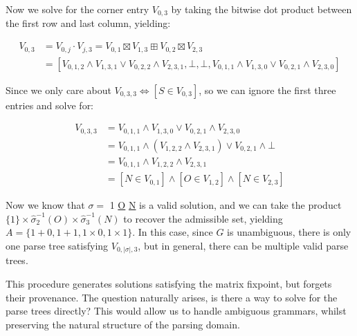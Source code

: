 \documentclass[sigplan,review,anonymous,acmsmall]{acmart}\settopmatter{printfolios=false,printccs=false,printacmref=false}
\begin{document}
  Now we solve for the corner entry $V_{0, 3}$ by taking the bitwise dot product between the first row and last column, yielding:

  \begin{align*}
    V_{0, 3} &= V_{0, j} \cdot V_{j, 3} = V_{0, 1} \boxtimes V_{1, 3} \boxplus V_{0, 2} \boxtimes V_{2, 3}\\
    &= [V_{0, 1, 2} \land V_{1, 3, 1} \lor V_{0, 2, 2} \land V_{2, 3, 1}, \bot, \bot, V_{0, 1, 1} \land V_{1, 3, 0} \lor V_{0, 2, 1} \land V_{2, 3, 0}]
  \end{align*}

  \noindent Since we only care about $V_{0, 3, 3} \Leftrightarrow [S \in V_{0, 3}]$, so we can ignore the first three entries and solve for:

  \begin{align*}
    V_{0, 3, 3} &= V_{0, 1, 1} \land V_{1, 3, 0} \lor V_{0, 2, 1} \land V_{2, 3, 0}\\
    &= V_{0, 1, 1} \land (V_{1, 2, 2} \land V_{2, 3, 1}) \lor V_{0, 2, 1} \land \bot\\
    &= V_{0, 1, 1} \land V_{1, 2, 2} \land V_{2, 3, 1}\\
    &= [N \in V_{0, 1}] \land [O \in V_{1, 2}] \land [N \in V_{2, 3}]
  \end{align*}

  Now we know that $\sigma =$ 1 \underline{O} \underline{N} is a valid solution, and we can take the product $\{1\}\times \hat\sigma_2^{-1}(O) \times \hat\sigma_3^{-1}(N)$ to recover the admissible set, yielding $A=\{1+0, 1+1, 1\times 0, 1\times 1\}$. In this case, since $G$ is unambiguous, there is only one parse tree satisfying $V_{0, |\sigma|, 3}$, but in general, there can be multiple valid parse trees.

  This procedure generates solutions satisfying the matrix fixpoint, but forgets their provenance. The question naturally arises, is there a way to solve for the parse trees directly? This would allow us to handle ambiguous grammars, whilst preserving the natural structure of the parsing domain.
\end{document}
